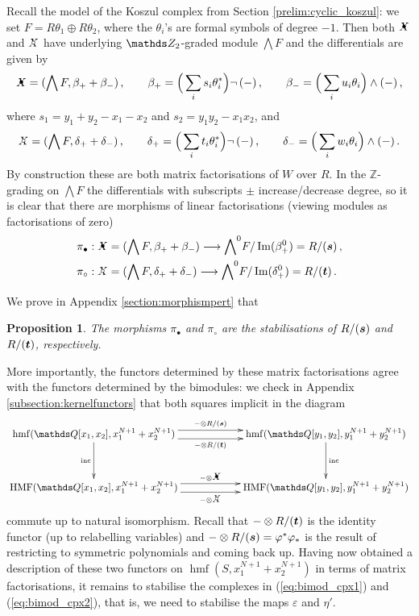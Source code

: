 \documentclass{compositio}
\newtheorem{proposition}[theorem]{Proposition}
\theoremstyle{definition}
\numberwithin{equation}{section}
\def\inc{\operatorname{inc}}
\def\Im{\operatorname{Im}}
\DeclareMathOperator{\hmf}{hmf}
\DeclareMathOperator{\HMF}{HMF}
\begin{document}
Recall the model of the Koszul complex from Section \ref{prelim:cyclic_koszul}: we set $F = R \theta_1 \oplus R \theta_2$, where the $\theta_{i}$'s are formal symbols of degree $-1$. Then both $\Xbul$ and $\Xcirc$ have underlying $\Ztwo$-graded module $\bigwedge F$ and the differentials are given by
\[
\Xbul = ( \bigwedge F, \beta_+ + \beta_{-}) \, , \qquad \beta_+ = \Big(\sum_i s_i \theta_i^*\Big) \neg\, (-) \, , \qquad \beta_{-} = \Big(\sum_i u_i \theta_i\Big) \wedge (-) \, ,
\]
where $s_1 = y_1 + y_2 - x_1 - x_2$ and $s_2 = y_1 y_2 - x_1 x_2$, and
\[
\Xcirc = ( \bigwedge F, \delta_+ + \delta_{-}) \, , \qquad \delta_+ = \Big(\sum_i t_i \theta_i^*\Big) \neg\, (-) \, , \qquad \delta_{-} = \Big(\sum_i w_i \theta_i\Big) \wedge (-) \, .
\]
By construction these are both matrix factorisations of $W$ over $R$. In the $\mathds{Z}$-grading on $\bigwedge F$ the differentials with subscripts $\pm$ increase/decrease degree, so it is clear that there are morphisms of linear factorisations (viewing modules as factorisations of zero)
\begin{align*}
& \pi_{\bullet}: \Xbul = ( \bigwedge F, \beta_+ + \beta_{-}) \lto {\bigwedge}^0 F/\Im(\beta_+^0) = R/(\boldsymbol{s}) \, ,\\
& \pi_{\circ}: \Xcirc = ( \bigwedge F, \delta_+ + \delta_{-}) \lto {\bigwedge}^0 F/\Im(\delta_+^0) = R/(\boldsymbol{t}) \, .
\end{align*}

We prove in Appendix \ref{section:morphismpert} that

\begin{proposition} The morphisms $\pi_{\bullet}$ and $\pi_{\circ}$ are the stabilisations of $R/(\boldsymbol{s})$ and $R/(\boldsymbol{t})$, respectively.
\end{proposition}

More importantly, the functors determined by these matrix factorisations agree with the functors determined by the bimodules: we check in Appendix \ref{subsection:kernelfunctors} that both squares implicit in the diagram
\[
\xymatrix@C+3pc@R+1pc{
\hmf(\QQ[x_1,x_2], x_1^{N+1} + x_2^{N+1})\ar[d]_-{\inc}\ar@<1ex>[r]^-{- \otimes R/(\bs{s})}
\ar@<-1ex>[r]_-{- \otimes R/(\bs{t})}
& \hmf(\QQ[y_1,y_2], y_1^{N+1} + y_2^{N+1})\ar[d]^-{\inc}\\
\HMF(\QQ[x_1,x_2], x_1^{N+1} + x_2^{N+1})\ar@<1ex>[r]^-{- \otimes \Xbul}
\ar@<-1ex>[r]_-{- \otimes \Xcirc}
& \HMF(\QQ[y_1,y_2], y_1^{N+1} + y_2^{N+1})
}
\]
commute up to natural isomorphism. Recall that $- \otimes R/(\boldsymbol{t})$ is the identity functor (up to relabelling variables) and $- \otimes R/(\boldsymbol{s}) = \varphi^* \varphi_*$ is the result of restricting to symmetric polynomials and coming back up. Having now obtained a description of these two functors on $\hmf(S, x_1^{N+1} + x_2^{N+1})$ in terms of matrix factorisations, it remains to stabilise the complexes in (\ref{eq:bimod_cpx1}) and (\ref{eq:bimod_cpx2}), that is, we need to stabilise the maps $\varepsilon$ and $\eta'$. 
\end{document}
